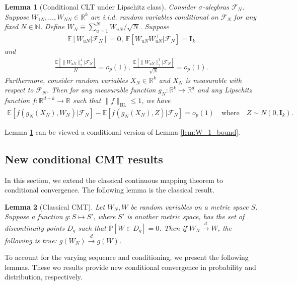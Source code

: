 \documentclass[12pt]{article}
\newtheorem{lemma}{Lemma}
\def\P{\mathbb{P}}
\def\P{\mathbb{P}}
\newcommand{\E}{\mathbb E}								%
\renewcommand{\P}{\mathbb{P}}							%
\newcommand{\convd}{\overset d \rightarrow}             %
\begin{document}
\begin{lemma}[Conditional CLT under Lipschitz class]\label{lem:CLT_BL}
	Consider $\sigma$-alegbras $\mathcal{F}_N$. Suppose $W_{1N},\ldots,W_{NN}\in\mathbb{R}^k$ are i.i.d. random variables conditional on $\mathcal{F}_N$ for any fixed $N\in\mathbb{N}$. Define $W_N\equiv \sum_{u=1}^N W_{uN}/\sqrt{N}$.  Suppose
	\begin{align*}
		\E[W_{uN}|\mathcal{F}_N]=\bm 0,\ \E[W_{uN}W_{uN}^\top|\mathcal{F}_N]=\bm I_{k}
	\end{align*}
	and 
	\begin{align*}
		\frac{\E[\|W_{uN}\|_2^4|\mathcal{F}_N]}{N}=o_p(1),\ \frac{\E[\|W_{uN}\|_2^3|\mathcal{F}_N]}{\sqrt{N}}=o_p(1).
	\end{align*}
	Furthermore, consider random variables $X_N\in\mathbb{R}^k$ and $X_N$ is measurable with respect to $\mathcal{F}_N$. Then for any measurable function $g_N:\mathbb{R}^k\mapsto\mathbb{R}^d$ and any Lipschitz function $f:\mathbb{R}^{d+k}\rightarrow\mathbb{R}$ such that $\|f\|_{\mathrm{BL}}\leq 1$, we have
	\begin{align*}
		\E[f(g_N(X_N),W_N)|\mathcal{F}_N]-\E[f(g_N(X_N),Z)|\mathcal{F}_N]=o_p(1)\quad\text{where}\quad Z\sim N(0,\bm I_{k}).
	\end{align*}
\end{lemma}

\noindent Lemma \ref{lem:CLT_BL} can be viewed a conditional version of Lemma \ref{lem:W_1_bound}.

\subsection{New conditional CMT results}\label{sec:conditional_CMT}

In this section, we extend the classical continuous mapping theorem to conditional convergence. The following lemma is the classical result.

\begin{lemma}[Classical CMT]\label{lem:continuous_mapping_lem}
	Let $W_N,W$ be random variables on a metric space $S$. Suppose a function $g:S\mapsto S'$, where $S'$ is another metric space, has the set of discontinuity points $D_g$ such that $\P[W\in D_g]=0$. Then if $W_N\convd W$, the following is true: $g(W_N)\convd g(W)$.
\end{lemma}

\noindent To account for the varying sequence and conditioning, we present the following lemmas. These wo results provide new conditional convergence in probability and distribution, respectively. 
\end{document}
